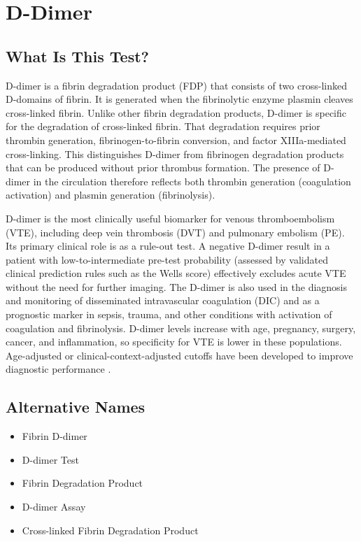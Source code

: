 \chapter{D-Dimer}

\section*{What Is This Test?}
D-dimer is a fibrin degradation product (FDP) that consists of two cross-linked D-domains of fibrin. It is generated when the fibrinolytic enzyme plasmin cleaves cross-linked fibrin. Unlike other fibrin degradation products, D-dimer is specific for the degradation of cross-linked fibrin. That degradation requires prior thrombin generation, fibrinogen-to-fibrin conversion, and factor XIIIa-mediated cross-linking. This distinguishes D-dimer from fibrinogen degradation products that can be produced without prior thrombus formation. The presence of D-dimer in the circulation therefore reflects both thrombin generation (coagulation activation) and plasmin generation (fibrinolysis).

D-dimer is the most clinically useful biomarker for venous thromboembolism (VTE), including deep vein thrombosis (DVT) and pulmonary embolism (PE). Its primary clinical role is as a rule-out test. A negative D-dimer result in a patient with low-to-intermediate pre-test probability (assessed by validated clinical prediction rules such as the Wells score) effectively excludes acute VTE without the need for further imaging. The D-dimer is also used in the diagnosis and monitoring of disseminated intravascular coagulation (DIC) and as a prognostic marker in sepsis, trauma, and other conditions with activation of coagulation and fibrinolysis. D-dimer levels increase with age, pregnancy, surgery, cancer, and inflammation, so specificity for VTE is lower in these populations. Age-adjusted or clinical-context-adjusted cutoffs have been developed to improve diagnostic performance \cite{adam2009ddimer}.

\section*{Alternative Names}
\begin{itemize}
  \item Fibrin D-dimer
  \item D-dimer Test
  \item Fibrin Degradation Product
  \item D-dimer Assay
  \item Cross-linked Fibrin Degradation Product
\end{itemize}
